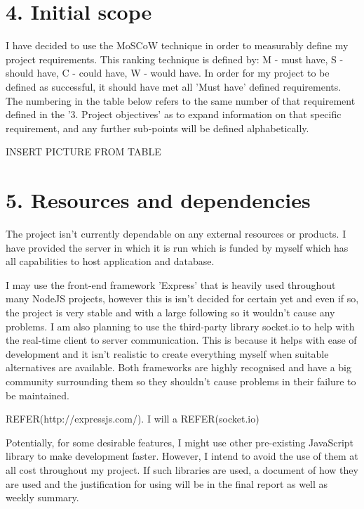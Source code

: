 \documentclass[a4paper]{article}
\begin{document}
\section{4. Initial scope}

I have decided to use the MoSCoW technique in order to measurably define my project requirements. This ranking technique is defined by: M - must have, S - should have, C - could have, W - would have. In order for my project to be defined as successful, it should have met all 'Must have' defined requirements. The numbering in the table below refers to the same number of that requirement defined in the '3. Project objectives' as to expand information on that specific requirement, and any further sub-points will be defined alphabetically.

INSERT PICTURE FROM TABLE

\section{5. Resources and dependencies}

The project isn't currently dependable on any external resources or products. I have provided the server in which it is run which is funded by myself which has all capabilities to host application and database.

I may use the front-end framework 'Express' that is heavily used throughout many NodeJS projects, however this is isn't decided for certain yet and even if so, the project is very stable and with a large following so it wouldn't cause any problems. I am also planning to use the third-party library socket.io to help with the real-time client to server communication. This is because it helps with ease of development and it isn't realistic to create everything myself when suitable alternatives are available. Both frameworks are highly recognised and have a big community surrounding them so they shouldn't cause problems in their failure to be maintained.

REFER(http://expressjs.com/). I will a
REFER(socket.io)


Potentially, for some desirable features, I might use other pre-existing JavaScript library to make development faster. However, I intend to avoid the use of them at all cost throughout my project. If such libraries are used, a document of how they are used and the justification for using will be in the final report as well as weekly summary. \par
\end{document}
